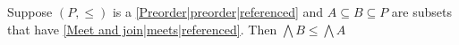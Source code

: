 

Suppose $(P,\leq)$ is a \ref{Preorder|preorder|referenced} and $A \subseteq B \subseteq P$ are subsets that have \ref{Meet and join|meets|referenced}. Then $\bigwedge B \leq \bigwedge A$
